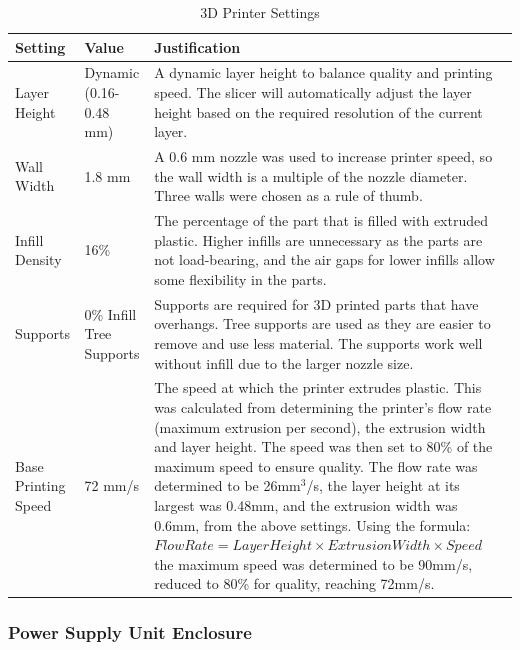 \begin{table}[H]
    \centering
    {\fontsize{12pt}{14pt}\selectfont
    \begin{tabularx}{\textwidth}{|p{3cm}|p{3cm}|X|}
        \hline
        \textbf{Setting} & \textbf{Value} & \textbf{Justification} \\
        \hline
        Layer Height & Dynamic (0.16-0.48 mm) & A dynamic layer height to balance quality and printing speed. The slicer will automatically adjust the layer height based on the required resolution of the current layer. \\
        \hline
        Wall Width & 1.8 mm & A 0.6 mm nozzle was used to increase printer speed, so the wall width is a multiple of the nozzle diameter. Three walls were chosen as a rule of thumb. \\
        \hline
        Infill Density & 16\% & The percentage of the part that is filled with extruded plastic. Higher infills are unnecessary as the parts are not load-bearing, and the air gaps for lower infills allow some flexibility in the parts. \\
        \hline
        Supports & 0\% Infill Tree Supports & Supports are required for 3D printed parts that have overhangs. Tree supports are used as they are easier to remove and use less material. The supports work well without infill due to the larger nozzle size. \\
        \hline
        Base Printing Speed & 72 mm/s & The speed at which the printer extrudes plastic. This was calculated from determining the printer's flow rate (maximum extrusion per second), the extrusion width and layer height. The speed was then set to 80\% of the maximum speed to ensure quality. The flow rate was determined to be 26mm$^3$/s, the layer height at its largest was 0.48mm, and the extrusion width was 0.6mm, from the above settings. Using the formula: \linebreak $Flow Rate = Layer Height \times Extrusion Width \times Speed$ \linebreak the maximum speed was determined to be 90mm/s, reduced to 80\% for quality, reaching 72mm/s. \\
        \hline
    \end{tabularx}
    }
    \caption{3D Printer Settings}
    \label{tab:3dprintersettings}
\end{table}

\subsubsection{Power Supply Unit Enclosure}
\label{sec:power-supply-unit-enclosure}

